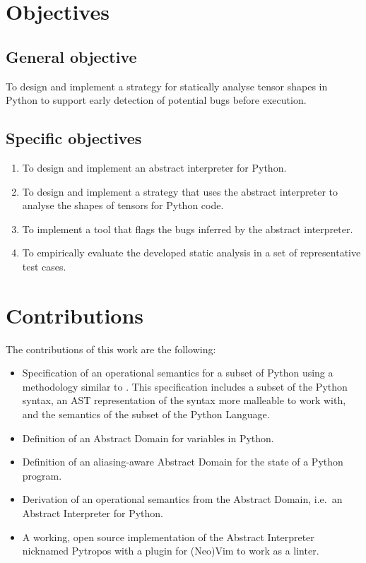 \section{Objectives}\label{objectives}

\subsection{General objective}\label{general-objective}

To design and implement a strategy for statically analyse tensor shapes
in Python to support early detection of potential bugs before execution.

\subsection{Specific objectives}\label{specific-objectives}

\begin{enumerate}
\def\labelenumi{\arabic{enumi}.}
\tightlist
\item
  To design and implement an abstract interpreter for Python.
\item
  To design and implement a strategy that uses the abstract interpreter
  to analyse the shapes of tensors for Python code.
\item
  To implement a tool that flags the bugs inferred by the abstract
  interpreter.
\item
  To empirically evaluate the developed static analysis in a set of
  representative test cases.
\end{enumerate}

\section{Contributions}\label{contributions}

The contributions of this work are the following:

\begin{itemize}
\tightlist
\item Specification of an operational semantics for a subset of Python using a methodology
  similar to \textcite{fromherz_static_2018}. This specification includes a subset of the
  Python syntax, an AST representation of the syntax more malleable to work with, and the
  semantics of the subset of the Python Language.
\item Definition of an Abstract Domain for variables in Python.
\item Definition of an aliasing-aware Abstract Domain for the state of a Python program.
\item Derivation of an operational semantics from the Abstract Domain, i.e.~an Abstract
  Interpreter for Python.
\item A working, open source implementation of the Abstract Interpreter nicknamed
  Pytropos\footnotemark{} with a plugin for (Neo)Vim to work as a linter.
\end{itemize}

